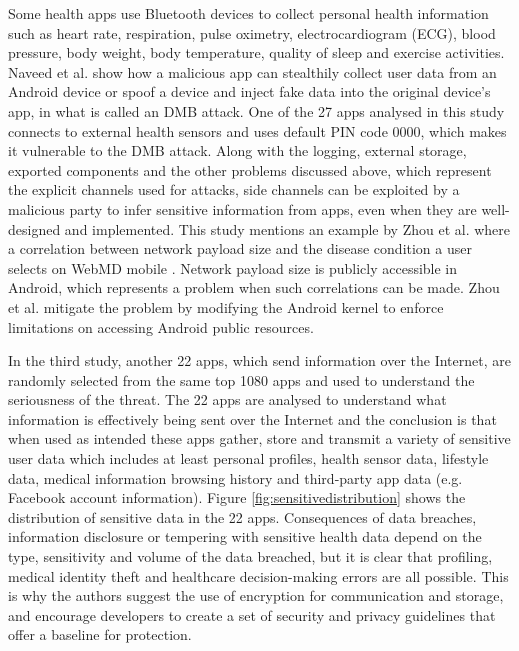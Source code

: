 Some health apps use Bluetooth devices to collect personal health information such as heart rate, respiration, pulse oximetry, electrocardiogram (ECG), blood pressure, body weight, body temperature, quality of sleep and exercise activities. Naveed et al. \cite{naveed2014inside} show how a malicious app can stealthily collect user data from an Android device or spoof a device and inject fake data into the original device's app, in what is called an \ac{DMB} attack. One of the 27 apps analysed in this study connects to external health sensors and uses default PIN code 0000, which makes it vulnerable to the \ac{DMB} attack. Along with the logging, external storage, exported components and the other problems discussed above, which represent the explicit channels used for attacks, side channels can be exploited by a malicious party to infer sensitive information from apps, even when they are well-designed and implemented. This study mentions an example by Zhou et al. \cite{zhou2013identity} where a correlation between network payload size and the disease condition a user selects on WebMD mobile \cite{webmd}. Network payload size is publicly accessible in Android, which represents a problem when such correlations can be made. Zhou et al. \cite{zhou2013identity} mitigate the problem by modifying the Android kernel to enforce limitations on accessing Android public resources. 

In the third study, another 22 apps, which send information over the Internet, are randomly selected from the same top 1080 apps and used to understand the seriousness of the threat. The 22 apps are analysed to understand what information is effectively being sent over the Internet and the conclusion is that when used as intended these apps gather, store and transmit a variety of sensitive user data which includes at least personal profiles, health sensor data, lifestyle data, medical information browsing history and third-party app data (e.g. Facebook account information). Figure \ref{fig:sensitivedistribution} shows the distribution of sensitive data in the 22 apps. Consequences of data breaches, information disclosure or tempering with sensitive health data depend on the type, sensitivity and volume of the data breached, but it is clear that profiling, medical identity theft and healthcare decision-making errors are all possible. This is why the authors suggest the use of encryption for communication and storage, and encourage developers to create a set of security and privacy guidelines that offer a baseline for protection.

